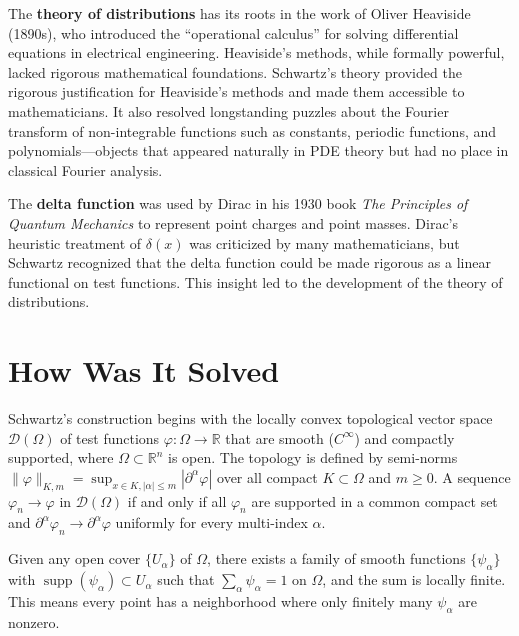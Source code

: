 The \textbf{theory of distributions} has its roots in the work of Oliver Heaviside (1890s), who introduced the ``operational calculus'' for solving differential equations in electrical engineering. Heaviside's methods, while formally powerful, lacked rigorous mathematical foundations. Schwartz's theory provided the rigorous justification for Heaviside's methods and made them accessible to mathematicians. It also resolved longstanding puzzles about the Fourier transform of non-integrable functions such as constants, periodic functions, and polynomials---objects that appeared naturally in PDE theory but had no place in classical Fourier analysis.

The \textbf{delta function} was used by Dirac in his 1930 book \emph{The Principles of Quantum Mechanics} to represent point charges and point masses. Dirac's heuristic treatment of $\delta(x)$ was criticized by many mathematicians, but Schwartz recognized that the delta function could be made rigorous as a linear functional on test functions. This insight led to the development of the theory of distributions.

\section{How Was It Solved}

Schwartz's construction begins with the locally convex topological vector space $\mathcal{D}(\Omega)$ of test functions $\varphi: \Omega \to \mathbb{R}$ that are smooth ($C^\infty$) and compactly supported, where $\Omega \subset \mathbb{R}^n$ is open. The topology is defined by semi-norms $\|\varphi\|_{K,m} = \sup_{x \in K, |\alpha| \leq m} |\partial^\alpha \varphi|$ over all compact $K \subset \Omega$ and $m \geq 0$. A sequence $\varphi_n \to \varphi$ in $\mathcal{D}(\Omega)$ if and only if all $\varphi_n$ are supported in a common compact set and $\partial^\alpha \varphi_n \to \partial^\alpha \varphi$ uniformly for every multi-index $\alpha$.

\begin{theorem}
Given any open cover $\{U_\alpha\}$ of $\Omega$, there exists a family of smooth functions $\{\psi_\alpha\}$ with $\operatorname{supp}(\psi_\alpha) \subset U_\alpha$ such that $\sum_\alpha \psi_\alpha = 1$ on $\Omega$, and the sum is locally finite. This means every point has a neighborhood where only finitely many $\psi_\alpha$ are nonzero.
\end{theorem}

